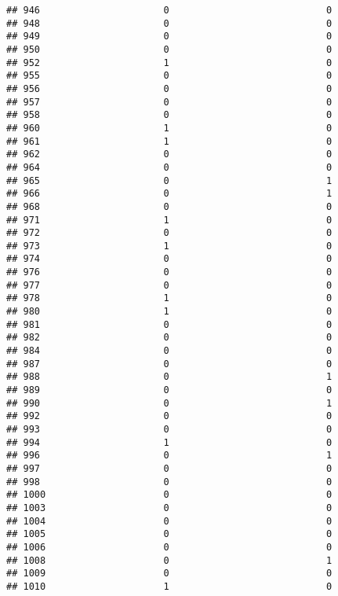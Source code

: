\documentclass[
]{article}
\begin{document}
\begin{verbatim}
## 946                      0                            0
## 948                      0                            0
## 949                      0                            0
## 950                      0                            0
## 952                      1                            0
## 955                      0                            0
## 956                      0                            0
## 957                      0                            0
## 958                      0                            0
## 960                      1                            0
## 961                      1                            0
## 962                      0                            0
## 964                      0                            0
## 965                      0                            1
## 966                      0                            1
## 968                      0                            0
## 971                      1                            0
## 972                      0                            0
## 973                      1                            0
## 974                      0                            0
## 976                      0                            0
## 977                      0                            0
## 978                      1                            0
## 980                      1                            0
## 981                      0                            0
## 982                      0                            0
## 984                      0                            0
## 987                      0                            0
## 988                      0                            1
## 989                      0                            0
## 990                      0                            1
## 992                      0                            0
## 993                      0                            0
## 994                      1                            0
## 996                      0                            1
## 997                      0                            0
## 998                      0                            0
## 1000                     0                            0
## 1003                     0                            0
## 1004                     0                            0
## 1005                     0                            0
## 1006                     0                            0
## 1008                     0                            1
## 1009                     0                            0
## 1010                     1                            0

\end{verbatim}
\end{document}
